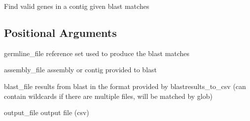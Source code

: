 \documentclass[letterpaper,10pt,english]{sphinxmanual}
\begin{document}
\sphinxAtStartPar

\sphinxAtStartPar
Find valid genes in a contig given blast matches


\begin{sphinxVerbatim}[commandchars=\\\{\}]
  \PYG{p}{[}\PYG{p}{]} \PYG{p}{[} \PYG{p}{]} \PYG{p}{[} \PYG{p}{]} \PYG{p}{[} \PYG{p}{]} \PYG{p}{[} \PYG{p}{]} \PYG{p}{[} \PYG{p}{]} \PYG{p}{[} \PYG{p}{]} \PYG{p}{[}\PYG{p}{]}    
\end{sphinxVerbatim}


\subsection{Positional Arguments}
\label{\detokenize{tools/find_alignments:positional-arguments}}\begin{optionlist}{3cm}
\item [germline\_file]  
\sphinxAtStartPar
reference set used to produce the blast matches
\item [assembly\_file]  
\sphinxAtStartPar
assembly or contig provided to blast
\item [blast\_file]  
\sphinxAtStartPar
results from blast in the format provided by blastresults\_to\_csv (can contain wildcards if there are multiple files, will be matched by glob)
\item [output\_file]  
\sphinxAtStartPar
output file (csv)
\end{optionlist}
\end{document}
